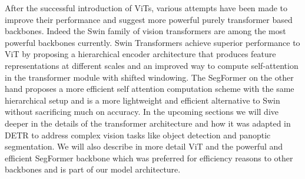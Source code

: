 After the successful introduction of ViTs, various attempts have been made to improve their performance and suggest more powerful purely transformer based backbones. Indeed the Swin \cite{swin} family of vision transformers are among the most powerful backbones currently. Swin Transformers achieve superior performance to ViT by proposing a hierarchical encoder architecture that produces feature representations at different scales and an improved way to compute self-attention in the transformer module with shifted windowing. The SegFormer \cite{segformer} on the other hand proposes a more efficient self attention computation scheme with the same hierarchical setup and is a more lightweight and efficient alternative to Swin without sacrificing much on accuracy.
In the upcoming sections we will dive deeper in the details of the transformer architecture and how it was adapted in DETR to address complex vision tasks like object detection and panoptic segmentation. We will also describe in more detail ViT and the powerful and efficient SegFormer backbone which was preferred for efficiency reasons to other backbones and is part of our model architecture.
